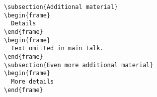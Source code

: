 \begin{command}{\appendix{}}
\begin{verbatim}
\subsection{Additional material}
\begin{frame}
  Details
\end{frame}
\begin{frame}
  Text omitted in main talk.
\end{frame}
\subsection{Even more additional material}
\begin{frame}
  More details
\end{frame}

\end{verbatim}
\end{command}
